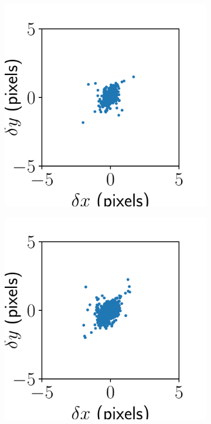 \documentclass{article}
\begin{document}
\begin{figure}[ht]
\begin{subfigure}{0.24\linewidth}
		\caption{}
		\label{fig:stitchresultBMS3}
	\end{subfigure}
	\begin{subfigure}{0.24\linewidth}
		\includegraphics[width=\linewidth]{stitch-result-BMS-2.pdf}
		\caption{}
		\label{fig:stitchresultBMS2}
	\end{subfigure}
	\begin{subfigure}{0.24\linewidth}
		\includegraphics[width=\linewidth]{stitch-result-BMS-1.pdf}

\end{subfigure}
\end{figure}
\end{document}
